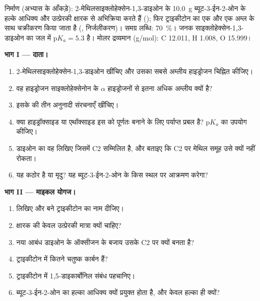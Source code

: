 \begin{problem}
\label{pb:b2:conjugate-additions:1}
निर्माण (अभ्यास के आँकड़े): 2-मेथिलसाइक्लोहेक्सेन-1,3-डाइओन के \qty{10.0}{g} ब्यूट-3-ईन-2-ओन के हल्के आधिक्य
और उत्प्रेरकी क्षारक से अभिक्रिया करते हैं (); फिर ट्राइकीटोन का एक
 और एक अम्ल के साथ चक्रीकरण किया जाता है (, निर्जलीकरण)। समग्र लब्धि: 70~\%। जनक साइक्लोहेक्सेन-1,3-डाइओन
का जल में $\mathrm pK_a = 5.3$ है। मोलर द्रव्यमान (\unit{g/mol}): C 12.011, H 1.008, O 15.999।

\medskip
\noindent\textbf{भाग I --- दाता।}
\begin{enumerate}
  \item 2-मेथिलसाइक्लोहेक्सेन-1,3-डाइओन खींचिए और उसका सबसे अम्लीय हाइड्रोजन चिह्नित कीजिए।
  \item वह हाइड्रोजन साइक्लोहेक्सेनोन के $\alpha$ हाइड्रोजनों से इतना अधिक अम्लीय क्यों है?
  \item इसके  की तीन अनुनादी संरचनाएँ खींचिए।
  \item क्या हाइड्रॉक्साइड या एथॉक्साइड इस  को पूर्णतः बनाने के लिए पर्याप्त प्रबल है? $\mathrm pK_a$ का उपयोग कीजिए।
  \item डाइओन का वह  लिखिए जिसमें C2 सम्मिलित है, और बताइए कि C2 पर मेथिल समूह
        उसे क्यों नहीं रोकता।
  \item यह  कठोर है या मृदु? यह ब्यूट-3-ईन-2-ओन के किस स्थल पर आक्रमण करेगा?
\end{enumerate}

\medskip
\noindent\textbf{भाग II --- माइकल योगज।}
\begin{enumerate}[resume]
  \item {} लिखिए और बने ट्राइकीटोन का नाम दीजिए।
  \item क्षारक की केवल उत्प्रेरकी मात्रा क्यों चाहिए?
  \item नया आबंध डाइओन के ऑक्सीजन के बजाय उसके C2 पर क्यों बनता है?
  \item ट्राइकीटोन में कितने चतुष्क कार्बन हैं?
  \item ट्राइकीटोन में 1,5-डाइकार्बोनिल संबंध पहचानिए।
  \item ब्यूट-3-ईन-2-ओन का हल्का आधिक्य क्यों प्रयुक्त होता है, और केवल हल्का ही क्यों?
\end{enumerate}


\end{problem}
